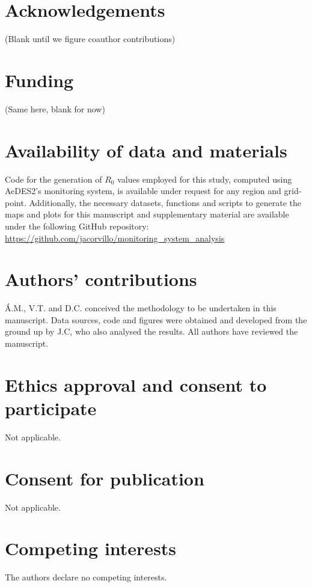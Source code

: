 \documentclass[10pt,twocolumn]{wlscirep}
\begin{document}
\section*{Acknowledgements} \label{sec-acknowledgements}

(Blank until we figure coauthor contributions)

\section*{Funding} \label{sec-funding}

(Same here, blank for now)

\section*{Availability of data and materials} \label{sec-availability}
Code for the generation of $R_0$ values employed for this study, computed using AeDES2's monitoring system, is available under request for any region and grid-point. Additionally, the necessary datasets, functions and scripts to generate the maps and plots for this manuscript and supplementary material are available under the following GitHub repository: \url{https://github.com/jacorvillo/monitoring_system_analysis}

\section*{Authors' contributions} \label{sec-authors-contributions}

Á.M., V.T. and D.C. conceived the methodology to be undertaken in this manuscript. Data sources, code and figures were obtained and developed from the ground up by J.C, who also analysed the results. All authors have reviewed the manuscript.

\section*{Ethics approval and consent to participate} \label{sec-ethics-approval}
Not applicable.

\section*{Consent for publication} \label{sec-consent-for-publication}
Not applicable.

\section*{Competing interests} \label{sec-competing-interests}
The authors declare no competing interests.


\end{document}
